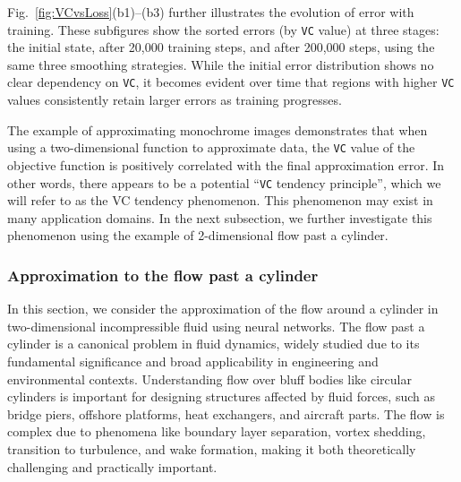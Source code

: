 \documentclass[final]{siamart220329}
\newtheorem{theoretical insights}{Theoretical insights}
\newtheorem{practical takeaway}{Practical takeaway}
\begin{document}
{Fig.~\ref{fig:VCvsLoss}(b1)–(b3) further illustrates the evolution of error with training. These subfigures show the sorted errors (by \texttt{VC} value) at three stages: the initial state, after 20,000 training steps, and after 200,000 steps, using the same three smoothing strategies. While the initial error distribution shows no clear dependency on \texttt{VC}, it becomes evident over time that regions with higher \texttt{VC} values consistently retain larger errors as training progresses.

\begin{sloppypar}
{\color{black} The example of approximating monochrome images demonstrates that when using a two-dimensional function to approximate data, the \texttt{VC} value of the objective function is positively correlated with the final approximation error. In other words, there appears to be a potential ``\texttt{VC} tendency principle'', which we will refer to as the VC tendency phenomenon. This phenomenon may exist in many application domains. In the next subsection, we further investigate this phenomenon using the example of 2-dimensional flow past a cylinder.}
\end{sloppypar}

\subsubsection{Approximation to the flow past a cylinder}\label{cylinder}
 

In this section, we consider the approximation of the flow around a cylinder in two-dimensional incompressible fluid using neural networks. 
{\color{black}The flow past a cylinder is a canonical problem in fluid dynamics, widely studied due to its fundamental significance and broad applicability in engineering and environmental contexts.} 
Understanding flow over bluff bodies like circular cylinders is important for designing structures affected by fluid forces, such as bridge piers, offshore platforms, heat exchangers, and aircraft parts. The flow is complex due to phenomena like boundary layer separation, vortex shedding, transition to turbulence, and wake formation, making it both theoretically challenging and practically important.

}
\end{document}
